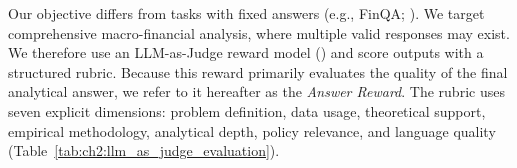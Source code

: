 Our objective differs from tasks with fixed answers (e.g., FinQA; \cite{chen2021finqa}). We target comprehensive macro-financial analysis, where multiple valid responses may exist. We therefore use an LLM-as-Judge reward model (\cite{zheng2023judging}) and score outputs with a structured rubric. Because this reward primarily evaluates the quality of the final analytical answer, we refer to it hereafter as the \textit{Answer Reward}. The rubric uses seven explicit dimensions: problem definition, data usage, theoretical support, empirical methodology, analytical depth, policy relevance, and language quality (Table~\ref{tab:ch2:llm_as_judge_evaluation}).




